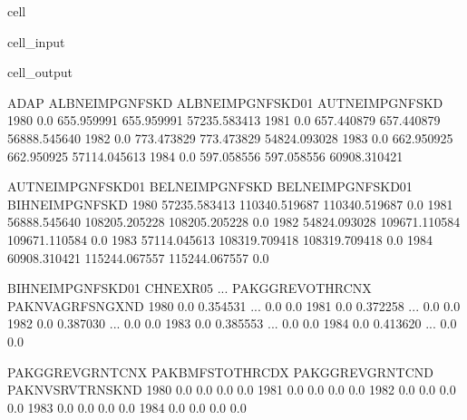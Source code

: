\documentclass[letterpaper,10pt,english]{jupyterBook}
\begin{document}
\begin{sphinxuseclass}{cell}\begin{sphinxVerbatimInput}

\begin{sphinxuseclass}{cell_input}
\begin{sphinxVerbatim}[commandchars=\\\{\}]
\end{sphinxVerbatim}

\end{sphinxuseclass}\end{sphinxVerbatimInput}
\begin{sphinxVerbatimOutput}

\begin{sphinxuseclass}{cell_output}
\begin{sphinxVerbatim}[commandchars=\\\{\}]
      ADAP  ALBNEIMPGNFSKD  ALBNEIMPGNFSKD01  AUTNEIMPGNFSKD  \PYGZbs{}
1980   0.0      655.959991        655.959991    57235.583413   
1981   0.0      657.440879        657.440879    56888.545640   
1982   0.0      773.473829        773.473829    54824.093028   
1983   0.0      662.950925        662.950925    57114.045613   
1984   0.0      597.058556        597.058556    60908.310421   

      AUTNEIMPGNFSKD01  BELNEIMPGNFSKD  BELNEIMPGNFSKD01  BIHNEIMPGNFSKD  \PYGZbs{}
1980      57235.583413   110340.519687     110340.519687             0.0   
1981      56888.545640   108205.205228     108205.205228             0.0   
1982      54824.093028   109671.110584     109671.110584             0.0   
1983      57114.045613   108319.709418     108319.709418             0.0   
1984      60908.310421   115244.067557     115244.067557             0.0   

      BIHNEIMPGNFSKD01  CHNEXR05  ...  PAKGGREVOTHRCN\PYGZus{}X  PAKNVAGRFSNGXN\PYGZus{}D  \PYGZbs{}
1980               0.0  0.354531  ...               0.0               0.0   
1981               0.0  0.372258  ...               0.0               0.0   
1982               0.0  0.387030  ...               0.0               0.0   
1983               0.0  0.385553  ...               0.0               0.0   
1984               0.0  0.413620  ...               0.0               0.0   

      PAKGGREVGRNTCN\PYGZus{}X  PAKBMFSTOTHRCD\PYGZus{}X  PAKGGREVGRNTCN\PYGZus{}D  PAKNVSRVTRNSKN\PYGZus{}D  \PYGZbs{}
1980               0.0               0.0               0.0               0.0   
1981               0.0               0.0               0.0               0.0   
1982               0.0               0.0               0.0               0.0   
1983               0.0               0.0               0.0               0.0   
1984               0.0               0.0               0.0               0.0   


\end{sphinxVerbatim}
\end{sphinxuseclass}
\end{sphinxVerbatimOutput}
\end{sphinxuseclass}
\end{document}
